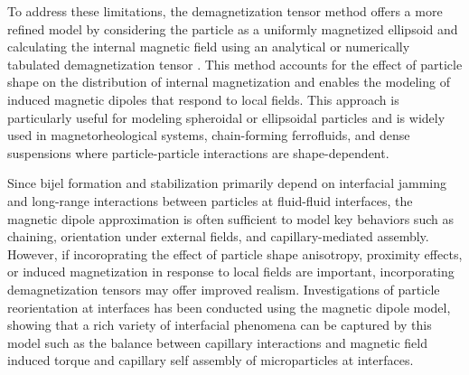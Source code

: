 To address these limitations, the demagnetization tensor method offers a more refined model by considering the particle as a uniformly magnetized ellipsoid and calculating the internal magnetic 
field using an analytical or numerically tabulated demagnetization tensor \cite{takahashi_ellipsoids_2017}. 
This method accounts for the effect of particle shape on the distribution of internal magnetization and enables the modeling of induced magnetic 
dipoles that respond to local fields. This approach is particularly useful for modeling spheroidal or ellipsoidal particles and is widely 
used in magnetorheological systems, chain-forming ferrofluids, and dense suspensions where particle-particle interactions are shape-dependent.




Since bijel formation and stabilization primarily depend on interfacial jamming and long-range interactions between particles at fluid-fluid interfaces, the magnetic dipole approximation 
is often sufficient to model key behaviors such as chaining, orientation under external fields, and capillary-mediated assembly. However, if incoroprating the effect of particle shape anisotropy, 
proximity effects, or induced magnetization in response to local fields are important, incorporating demagnetization tensors may offer improved realism. Investigations of particle reorientation at
interfaces has been conducted using the magnetic dipole model, showing that a rich variety of interfacial phenomena can be captured by this model such as the balance between capillary interactions
and magnetic field induced torque and capillary self assembly of microparticles at interfaces. \cite{xie_direct_2017,davies_interface_2014,davies_assembling_2014}